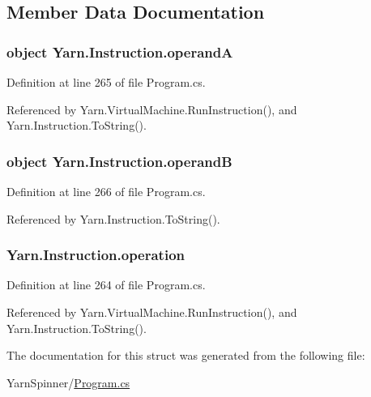 \subsection{Member Data Documentation}
\hypertarget{a00113_ab5d386faa0d3dbc23db80f8e62706afd}{
\subsubsection[{operand\-A}]{\setlength{\rightskip}{0pt plus 5cm}object Yarn.\-Instruction.\-operand\-A}}\label{a00113_ab5d386faa0d3dbc23db80f8e62706afd}


Definition at line 265 of file Program.\-cs.



Referenced by Yarn.\-Virtual\-Machine.\-Run\-Instruction(), and Yarn.\-Instruction.\-To\-String().

\hypertarget{a00113_a56348c6fe7eb919b7277afc06e5b224a}{
\subsubsection[{operand\-B}]{\setlength{\rightskip}{0pt plus 5cm}object Yarn.\-Instruction.\-operand\-B}}\label{a00113_a56348c6fe7eb919b7277afc06e5b224a}


Definition at line 266 of file Program.\-cs.



Referenced by Yarn.\-Instruction.\-To\-String().

\hypertarget{a00113_a566bf5f7198cc353ea5c3710cb3a31cb}{
\subsubsection[{operation}]{ Yarn.\-Instruction.\-operation}}\label{a00113_a566bf5f7198cc353ea5c3710cb3a31cb}


Definition at line 264 of file Program.\-cs.



Referenced by Yarn.\-Virtual\-Machine.\-Run\-Instruction(), and Yarn.\-Instruction.\-To\-String().



The documentation for this struct was generated from the following file\-:\begin{DoxyCompactItemize}
\item 
Yarn\-Spinner/\hyperlink{a00302}{Program.\-cs}\end{DoxyCompactItemize}
